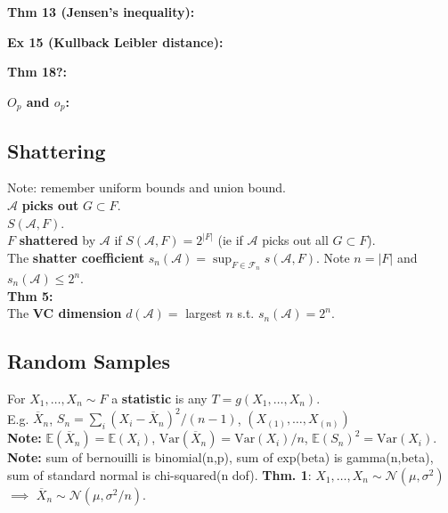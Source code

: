 \documentclass[10pt,twocolumn]{article}
\begin{document}
\textbf{Thm 13 (Jensen's inequality):}

\textbf{Ex 15 (Kullback Leibler distance):}

\textbf{Thm 18?:}

\textbf{$O_{p}$ and $o_{p}$:}


\subsection*{Shattering}
Note: remember uniform bounds and union bound.\\
$\mathcal{A}$ \textbf{picks out} $G \subset F$.\\
$S(\mathcal{A},F)$.\\
$F$ \textbf{shattered} by $\mathcal{A}$ if $S(\mathcal{A},F) = 2^{|F|}$ (ie if $\mathcal{A}$ picks out all $G \subset F$).\\
The \textbf{shatter coefficient} $s_{n}(\mathcal{A}) = \sup_{F \in \mathcal{F}_{n}} s(\mathcal{A},F)$. Note $n=|F|$ and $s_{n}(\mathcal{A}) \leq 2^{n}$.\\
\textbf{Thm 5:}\\
The \textbf{VC dimension} $d(\mathcal{A}) =$ largest $n$ s.t. $s_{n}(\mathcal{A}) = 2^{n}$.


\subsection*{Random Samples}
For $X_{1},\ldots,X_{n} \sim F$ a \textbf{statistic} is any $T = g(X_{1},\ldots,X_{n})$.\\
E.g. $\overline{X}_{n}$, $S_{n} = \sum_{i}(X_{i}-\overline{X}_{n})^{2} / (n-1)$, $\left(X_{(1)},\ldots,X_{(n)}\right)$\\
\textbf{Note:} $\mathbb{E}(\overline{X}_{n}) = \mathbb{E}(X_{i})$, $\text{Var}(\overline{X}_{n}) = \text{Var}(X_{i})/n$, $\mathbb{E}(S_{n})^{2} = \text{Var}(X_{i})$.\\
\textbf{Note:} sum of bernouilli is binomial(n,p), sum of exp(beta) is gamma(n,beta), sum of standard normal is chi-squared(n dof).
\textbf{Thm. 1}: $X_{1},\ldots,X_{n} \sim \mathcal{N}(\mu,\sigma^{2})$ $\implies$  $\overline{X}_{n} \sim \mathcal{N}(\mu, \sigma^{2}/n)$.
\end{document}
